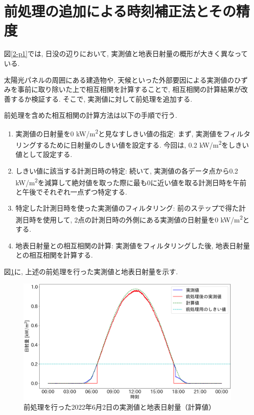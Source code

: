 \section{前処理の追加による時刻補正法とその精度}

図\ref{2-p1}では, 日没の辺りにおいて, 実測値と地表日射量の概形が大きく異なっている.

太陽光パネルの周囲にある建造物や, 天候といった外部要因による実測値のひずみを事前に取り除いた上で相互相関を計算することで, 相互相関の計算結果が改善するか検証する. そこで, 実測値に対して前処理を追加する.

前処理を含めた相互相関の計算方法は以下の手順で行う.

\begin{enumerate}
  \item 実測値の日射量を0 \si{\kilo\watt}/\si{\metre\squared}と見なすしきい値の指定: まず, 実測値をフィルタリングするために日射量のしきい値を設定する. 今回は, 0.2 \si{\kilo\watt}/\si{\metre\squared}をしきい値として設定する.
  \item しきい値に該当する計測日時の特定: 続いて, 実測値の各データ点から0.2 \si{\kilo\watt}/\si{\metre\squared}を減算して絶対値を取った際に最も0に近い値を取る計測日時を午前と午後でそれぞれ一点ずつ特定する.
  \item 特定した計測日時を使った実測値のフィルタリング: 前のステップで得た計測日時を使用して, 2点の計測日時の外側にある実測値の日射量を0 \si{\kilo\watt}/\si{\metre\squared}とする.
  \item 地表日射量との相互相関の計算: 実測値をフィルタリングした後, 地表日射量との相互相関を計算する.
\end{enumerate}

図\ref{2-p2}に, 上述の前処理を行った実測値と地表日射量を示す.

\begin{figure}[H]
  \begin{center}
    \includegraphics[width=140mm]{sotu/figure/2/drop-under-0.2-q.png}
    \caption{前処理を行った2022年6月2日の実測値と地表日射量（計算値）}
    \label{2-p2}
  \end{center}
\end{figure}

